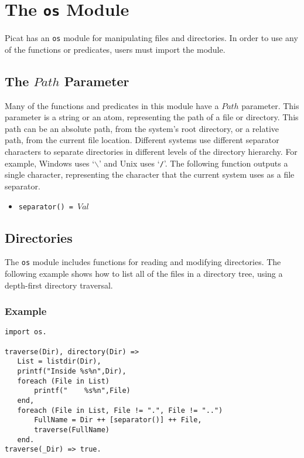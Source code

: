 \chapter{The \texttt{os} Module}
Picat has an \texttt{os} module for manipulating files and directories.  In order to use any of the functions or predicates, users must import the module.

\section{The $Path$ Parameter}
Many of the functions and predicates in this module have a $Path$ parameter.  This parameter is a string or an atom, representing the path of a file or directory.  This path can be an absolute path, from the system's root directory, or a relative path, from the current file location.  Different systems use different separator characters to separate directories in different levels of the directory hierarchy.  For example, Windows uses `\texttt{$\backslash$}' and Unix uses `\texttt{/}'.  The following function outputs a single character, representing the character that the current system uses as a file separator.
\begin{itemize}
\item \texttt{separator() = $Val$}
\end{itemize}

\section{Directories}
The \texttt{os} module includes functions for reading and modifying directories.  The following example shows how to list all of the files in a directory tree, using a depth-first directory traversal.

\subsection*{Example}
\begin{verbatim}
import os.

traverse(Dir), directory(Dir) =>
   List = listdir(Dir),
   printf("Inside %s%n",Dir),
   foreach (File in List)
       printf("    %s%n",File)
   end,
   foreach (File in List, File != ".", File != "..")
       FullName = Dir ++ [separator()] ++ File,
       traverse(FullName) 
   end.
traverse(_Dir) => true.
\end{verbatim}

